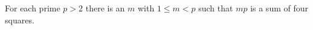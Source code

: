 For each prime $p > 2$ there is an $m$ with $1 \leq m < p$ such that $mp$ is a sum of four squares.
